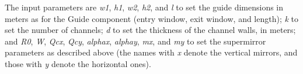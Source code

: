 The input parameters are \textit{w1}, \textit{h1}, \textit{w2},
\textit{h2}, and \textit{l} to set the guide dimensions in meters as for
the Guide component (entry window, exit window, and length); \textit{k}
to set the number of channels; \textit{d} to set the thickness of the
channel walls, in meters; and \textit{R0}, \textit{W}, \textit{Qcx},
\textit{Qcy}, \textit{alphax}, \textit{alphay}, \textit{mx}, and \textit{my} to
set the supermirror parameters as described above (the names with \textit{x}
denote the vertical mirrors, and those with \textit{y} denote the horizontal
ones).
